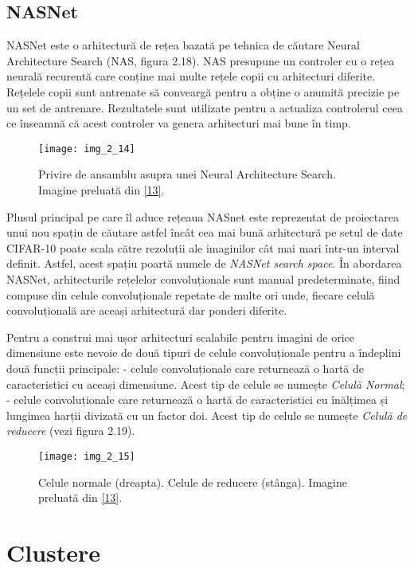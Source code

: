\subsection{NASNet}
NASNet este o arhitectură de rețea bazată pe tehnica de căutare Neural Architecture Search (NAS, figura 2.18). NAS presupune un controler cu o rețea neurală recurentă care conține mai multe rețele copii cu arhitecturi diferite. Rețelele copii sunt antrenate să conveargă pentru a obține o anumită precizie pe un set de antrenare. Rezultatele sunt utilizate pentru a actualiza controlerul ceea ce înseamnă că acest controler va genera arhitecturi mai bune în timp.
\begin{figure}[!h]
	\centering
	\texttt{[image: img\_2\_14]}
	\caption[NAS]{Privire de ansamblu asupra unei Neural Architecture Search. Imagine preluată din \hyperlink{Zoph2018LearningTA}{[13]}.}
\end{figure}  

Plusul principal pe care îl aduce rețeaua NASnet este reprezentat de proiectarea unui nou spațiu de căutare astfel încât cea mai bună arhitectură pe setul de date CIFAR-10 poate scala către rezoluții ale imaginilor cât mai mari într-un interval definit. Astfel, acest spațiu poartă numele de \textit{NASNet search space}. În abordarea NASNet, arhitecturile rețelelor convoluționale sunt manual predeterminate, fiind compuse din celule convoluționale repetate de multe ori unde, fiecare celulă convoluțională are aceași arhitectură dar ponderi diferite.

Pentru a construi mai ușor arhitecturi scalabile pentru imagini de orice dimensiune este nevoie de două tipuri de celule convoluționale pentru a îndeplini două funcții principale: - celule convoluționale care returnează o hartă de caracteristici cu aceași dimensiune. Acest tip de celule se numește \textit{Celulă Normal}; - celule convoluționale care returnează o hartă de caracteristici cu înălțimea și lungimea harții divizată cu un factor doi. Acest tip de celule se numește \textit{Celulă de reducere} (vezi figura 2.19).
\begin{figure}[!h]
	\centering
	\texttt{[image: img\_2\_15]}
	\caption[Celule normale și de reducere]{Celule normale (dreapta). Celule de reducere (stânga). Imagine preluată din \hyperlink{Zoph2018LearningTA}{[13]}.}
\end{figure}  

\section{Clustere}


